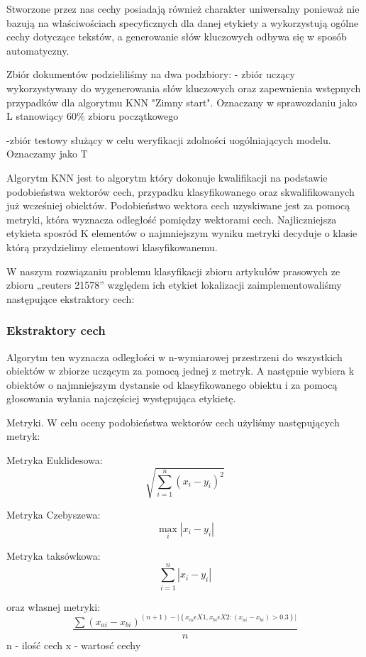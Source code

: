 \documentclass{classrep}
\begin{document}
Stworzone przez nas cechy posiadają również charakter uniwersalny ponieważ nie bazują na właściwościach specyficznych dla danej etykiety a wykorzystują ogólne cechy dotyczące tekstów, a generowanie słów kluczowych odbywa się w sposób automatyczny.


Zbiór dokumentów podzieliliśmy na dwa podzbiory:
- zbiór uczący wykorzystywany do wygenerowania słów kluczowych oraz zapewnienia wstępnych przypadków dla algorytmu KNN "Zimny start". Oznaczany w sprawozdaniu jako L stanowiący 60\% zbioru początkowego


-zbiór testowy służący w celu weryfikacji zdolności uogólniających modelu. Oznaczamy jako T

Algorytm KNN jest to algorytm który dokonuje kwalifikacji na podstawie podobieństwa wektorów cech, przypadku klasyfikowanego oraz skwalifikowanych już wcześniej obiektów.
Podobieństwo wektora cech uzyskiwane jest za pomocą metryki, która wyznacza odległość pomiędzy wektorami cech.
Najliczniejsza etykieta sposród K elementów o najmniejszym wyniku metryki decyduje o klasie którą przydzielimy elementowi klasyfikowanemu.


W naszym rozwiązaniu problemu klasyfikacji zbioru artykułów prasowych ze zbioru „reuters 21578” względem ich etykiet lokalizacji zaimplementowaliśmy następujące ekstraktory cech:
\subsubsection{Ekstraktory cech}

Algorytm ten wyznacza odległości w n-wymiarowej przestrzeni do wszystkich obiektów w zbiorze uczącym za pomocą jednej z metryk. A następnie wybiera k obiektów o najmniejszym dystansie od klasyfikowanego obiektu i za pomocą głosowania wyłania najczęściej występująca etykietę.

Metryki.
W celu oceny podobieństwa wektorów cech użyliśmy następujących metryk:

Metryka Euklidesowa:
$${\sqrt {\sum _{i=1}^{n}(x_{i}-y_{i})^{2}}}$$

Metryka Czebyszewa:
$$\max _{i}|x_{i}-y_{i}|$$


Metryka taksówkowa:
$$\sum _{i=1}^{n}|x_{i}-y_{i}|$$

oraz własnej metryki: 
$$\frac{\sum(x{_{ai}}-x{_{bi}})^{(n+1)-|\left \{ x{_{ai}} \epsilon X1,x{_{bi}} \epsilon X2 : (x{_{ai}}-x{_{bi}}) > 0.3 \right \}|}}{n}$$
n - ilość cech\newline
x - wartosć cechy\newline
\end{document}
